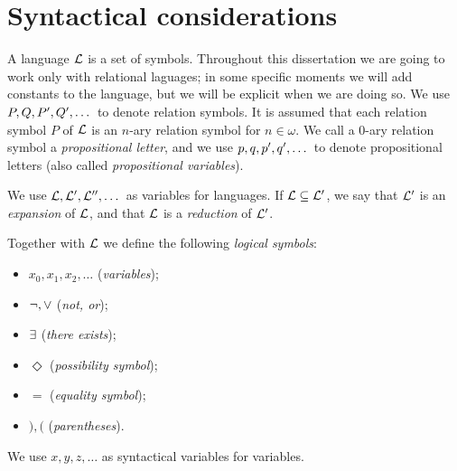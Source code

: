 \section{Syntactical considerations}

\begin{defn}
A language $\mathcal{L}$ is a set of symbols. Throughout this dissertation we are going to work only with relational laguages; in some specific moments we will add constants to the language, but we will be explicit when we are doing so. We use $P, Q, P^{\prime}, Q^{\prime}, \dots$ to denote relation symbols. It is assumed that each relation symbol $P$ of $\mathcal{L}$ is an $n$-ary relation symbol for $n \in \omega$. We call a $0$-ary relation symbol a \textit{propositional letter}, and we use $p,q,p^{\prime},q^{\prime}, \dots$ to denote propositional letters (also called \textit{propositional variables}). 

\qquad We use $\mathcal{L}, \mathcal{L}^{\prime}, \mathcal{L}^{\prime \prime}, \dots$ as variables for languages. If $\mathcal{L} \subseteq \mathcal{L}^{\prime}$, we say that $\mathcal{L}^{\prime}$ is an \textit{expansion} of $\mathcal{L}$, and that $\mathcal{L}$ is a \textit{reduction} of $\mathcal{L}^{\prime}$.
\end{defn}

\begin{defn}
Together with $\mathcal{L}$ we define the following \textit{logical symbols}:

\begin{itemize} 
\item $x_{0}, x_{1}, x_{2}, \dots$ (\textit{variables});
\item $\neg, \vee$ (\textit{not, or});
\item $\exists$ (\textit{there exists});
\item $\Diamond$ (\textit{possibility symbol});
\item $=$ (\textit{equality symbol});
\item $),($ (\textit{parentheses}).
\end{itemize}
\qquad We use $x, y, z, \dots$ as syntactical variables for variables.
\end{defn}

